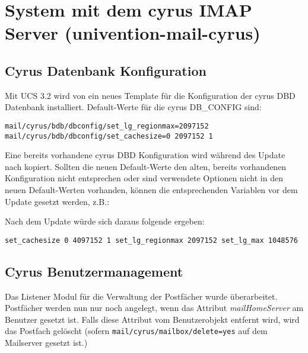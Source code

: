 \section{System mit dem cyrus IMAP Server (univention-mail-cyrus)}

\subsection{Cyrus Datenbank Konfiguration}

Mit UCS 3.2 wird von
 ein neues \ucsUCR{} Template
 für die Konfiguration der cyrus DBD
Datenbank installiert. Default-Werte für die cyrus DB\_CONFIG sind:

\texttt{mail/cyrus/bdb/dbconfig/set\_lg\_regionmax=2097152}\newline
\texttt{mail/cyrus/bdb/dbconfig/set\_cachesize=0 2097152 1}

Eine bereits vorhandene cyrus DBD Konfiguration wird während des Update nach
 kopiert. Sollten die neuen
Default-Werte den alten, bereits vorhandenen Konfiguration nicht entsprechen
oder sind verwendete Optionen nicht in den neuen Default-Werten vorhanden,
können die entsprechenden \ucsUCR{} Variablen vor dem Update gesetzt
werden, z.B.:

\newline
{}\newline
{}

Nach dem Update würde sich daraus folgende  ergeben:

\texttt{set\_cachesize 0 4097152 1\newline
set\_lg\_regionmax 2097152\newline
set\_lg\_max 1048576\newline
} 

\subsection{Cyrus Benutzermanagement}

Das Listener Modul für die Verwaltung der Postfächer wurde überarbeitet.
Postfächer werden nun nur noch angelegt, wenn das Attribut \emph{mailHomeServer} am
Benutzer gesetzt ist. Falls diese Attribut vom Benutzerobjekt entfernt wird,
wird das Postfach gelöscht (sofern
\texttt{mail/cyrus/mailbox/delete=yes} auf dem
Mailserver gesetzt ist.)

